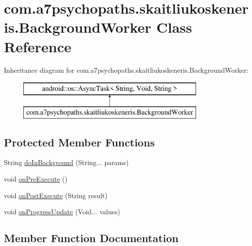 \hypertarget{classcom_1_1a7psychopaths_1_1skaitliukoskeneris_1_1_background_worker}{}\section{com.\+a7psychopaths.\+skaitliukoskeneris.\+Background\+Worker Class Reference}
\label{classcom_1_1a7psychopaths_1_1skaitliukoskeneris_1_1_background_worker}
Inheritance diagram for com.\+a7psychopaths.\+skaitliukoskeneris.\+Background\+Worker\+:\begin{figure}[H]
\begin{center}
\leavevmode
\includegraphics[height=2.000000cm]{classcom_1_1a7psychopaths_1_1skaitliukoskeneris_1_1_background_worker}
\end{center}
\end{figure}
\subsection*{Protected Member Functions}
\begin{DoxyCompactItemize}
\item 
String \mbox{\hyperlink{classcom_1_1a7psychopaths_1_1skaitliukoskeneris_1_1_background_worker_a9355965eb2e3e6907a25e6df962dba3e}{do\+In\+Background}} (String... params)
\item 
void \mbox{\hyperlink{classcom_1_1a7psychopaths_1_1skaitliukoskeneris_1_1_background_worker_a8ca2f3f8c5bce96c5ba5f2503eef991d}{on\+Pre\+Execute}} ()
\item 
void \mbox{\hyperlink{classcom_1_1a7psychopaths_1_1skaitliukoskeneris_1_1_background_worker_adec28c4419f0241f9c835ec864b80426}{on\+Post\+Execute}} (String result)
\item 
void \mbox{\hyperlink{classcom_1_1a7psychopaths_1_1skaitliukoskeneris_1_1_background_worker_a598c4211054a8aee7a61b1e13c652b00}{on\+Progress\+Update}} (Void... values)
\end{DoxyCompactItemize}


\subsection{Member Function Documentation}
\mbox{\label{classcom_1_1a7psychopaths_1_1skaitliukoskeneris_1_1_background_worker_a9355965eb2e3e6907a25e6df962dba3e}} 
